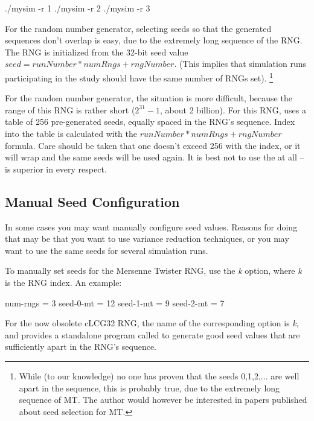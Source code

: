 \begin{commandline}
./mysim -r 1
./mysim -r 2
./mysim -r 3
\end{commandline}

For the  random number generator, selecting seeds
so that the generated sequences don't overlap is easy,
due to the extremely long sequence of the RNG.
The RNG is initialized from the 32-bit seed value $seed = runNumber*numRngs + rngNumber$.
(This implies that simulation runs participating in the study should have
the same number of RNGs set).
    \footnote{While (to our knowledge) no one has proven that the seeds 0,1,2,...
    are well apart in the sequence, this is probably true, due to the extremely
    long sequence of MT. The author would however be interested in papers
    published about seed selection for MT.}

For the  random number generator, the situation is more difficult,
because the range of this RNG is rather short ($2^{31}-1$, about 2 billion).
For this RNG, {\opp} uses a table of 256 pre-generated seeds, equally spaced
in the RNG's sequence. Index into the table is calculated with the
$runNumber*numRngs + rngNumber$ formula. Care should be taken that
one doesn't exceed 256 with the index, or it will wrap and the
same seeds will be used again. It is best not to use the 
at all --  is superior in every respect.


\subsection{Manual Seed Configuration}

In some cases you may want manually configure seed values.
Reasons for doing that may be that you want to use variance reduction
techniques, or you may want to use the same seeds for several simulation
runs.

To manually set seeds for the Mersenne Twister RNG, use the \textit{k}
option, where \textit{k} is the RNG index. An example:

\begin{inifile}
[General]
num-rngs = 3
seed-0-mt = 12
seed-1-mt = 9
seed-2-mt = 7
\end{inifile}

\label{sec:ch-config-sim:seedtool}

For the now obsolete cLCG32 RNG, the name of the corresponding option is
\textit{k}, and {\opp} provides a standalone program
called  to generate good seed values that
are sufficiently apart in the RNG's sequence.


